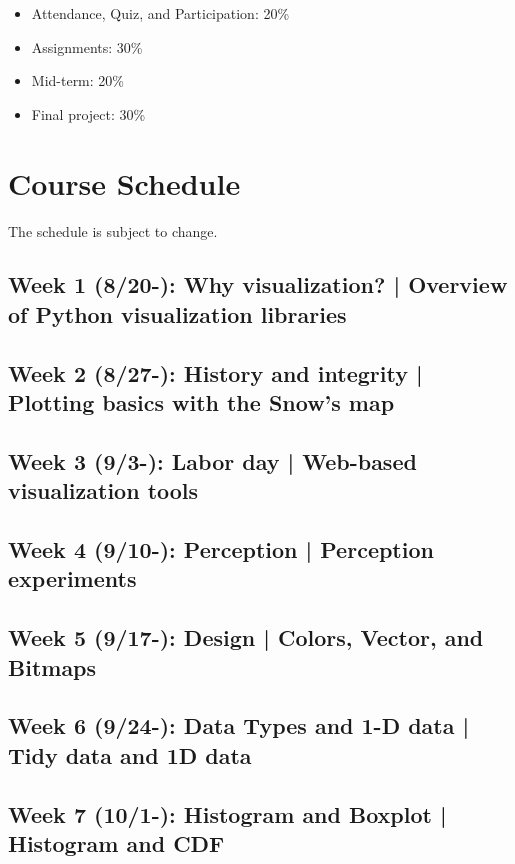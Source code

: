 \documentclass[11pt,article,oneside]{memoir} %
\begin{document}
\begin{itemize}%

\item Attendance, Quiz, and Participation: 20\%

\item Assignments: 30\%

\item Mid-term: 20\%

\item Final project: 30\%

\end{itemize}%
\section{Course Schedule}%

The schedule is subject to change. 


\subsection{Week 1 (8/20-): Why visualization? | Overview of Python visualization libraries}

\subsection{Week 2 (8/27-): History and integrity | Plotting basics with the Snow's map }
\subsection{Week 3 (9/3-): Labor day | Web-based visualization tools}
\subsection{Week 4 (9/10-): Perception | Perception experiments }
\subsection{Week 5 (9/17-): Design | Colors, Vector, and Bitmaps }
\subsection{Week 6 (9/24-): Data Types and 1-D data | Tidy data and 1D data } 
\subsection{Week 7 (10/1-): Histogram and Boxplot | Histogram and CDF }
\end{document}
